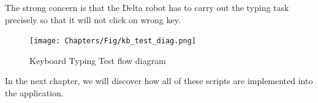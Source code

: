 The strong concern is that the Delta robot has to carry out the typing task precisely so that it will not click on wrong key.

	\begin{figure}[H]
		\centering
		\texttt{[image: Chapters/Fig/kb\_test\_diag.png]}
		\caption{Keyboard Typing Test flow diagram}
		\label{fig:kb_test_diag}
	\end{figure}

In the next chapter, we will discover how all of these scripts are implemented into the application.

